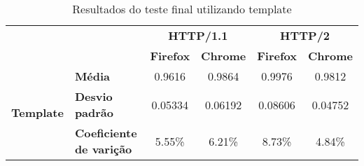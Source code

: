 \begin{table}[H]
\centering
\caption{Resultados do teste final utilizando template}
\label{resultados-template}
\begin{tabular}{ll|c|c|c|c|}
\cline{3-6}
                                                         & \multicolumn{1}{c|}{\textbf{}}  & \multicolumn{2}{c|}{\textbf{HTTP/1.1}} & \multicolumn{2}{c|}{\textbf{HTTP/2}} \\ \cline{3-6} 
\multicolumn{1}{c}{}                                     &                                 & \textbf{Firefox}   & \textbf{Chrome}   & \textbf{Firefox}  & \textbf{Chrome}  \\ \hline
\multicolumn{1}{|l|}{\multirow{3}{*}{\textbf{Template}}} & \textbf{Média}                  & 0.9616             & 0.9864            & 0.9976            & 0.9812           \\ \cline{2-6} 
\multicolumn{1}{|l|}{}                                   & \textbf{Desvio padrão}          & 0.05334            & 0.06192           & 0.08606           & 0.04752          \\ \cline{2-6} 
\multicolumn{1}{|l|}{}                                   & \textbf{Coeficiente de varição} & 5.55\%             & 6.21\%            & 8.73\%            & 4.84\%           \\ \hline
\end{tabular}
\end{table}